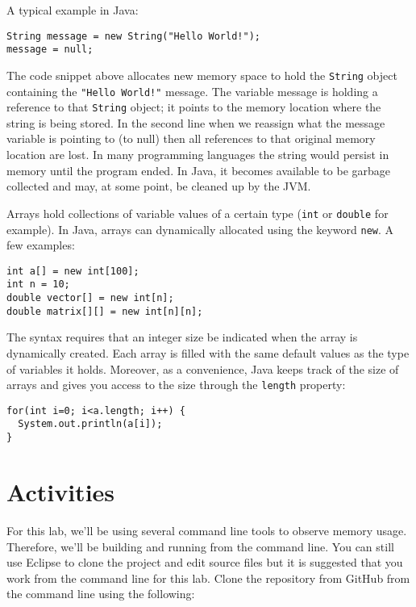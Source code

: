 \documentclass[12pt]{scrartcl}
\begin{document}
A typical example in Java:

\begin{verbatim}
String message = new String("Hello World!");
message = null;
\end{verbatim}

The code snippet above allocates new memory space to hold the 
\texttt{String} object containing the \texttt{"Hello World!"} 
message.  The variable message is holding a reference to that 
\texttt{String} object; it points to the memory location where 
the string is being stored.  In the second line when we reassign what 
the message variable is pointing to (to null) then all references to that 
original memory location are lost.  In many programming languages 
the string would persist in memory until the program ended.  In Java, 
it becomes available to be garbage collected and may, at some point, 
be cleaned up by the JVM.

Arrays hold collections of variable values of a certain type 
(\texttt{int} or \texttt{double} for example).
In Java, arrays can dynamically allocated using the keyword
\texttt{new}.  A few examples:

\begin{verbatim}
int a[] = new int[100];
int n = 10;
double vector[] = new int[n];
double matrix[][] = new int[n][n];
\end{verbatim}

The syntax requires that an integer size be indicated when the array 
is dynamically created.  Each array is filled with the same default 
values as the type of variables it holds.  Moreover, as a convenience, 
Java keeps track of the size of arrays and gives you access to the 
size through the \texttt{length} property:

\begin{verbatim}
for(int i=0; i<a.length; i++) { 
  System.out.println(a[i]); 
}
\end{verbatim}

\section{Activities}

For this lab, we'll be using several command line tools to observe memory
usage.  Therefore, we'll be building and running from the command line.
You can still use Eclipse to clone the project and edit source files but
it is suggested that you work from the command line for this lab.  Clone the repository from GitHub from the command line using the
following:
\end{document}
